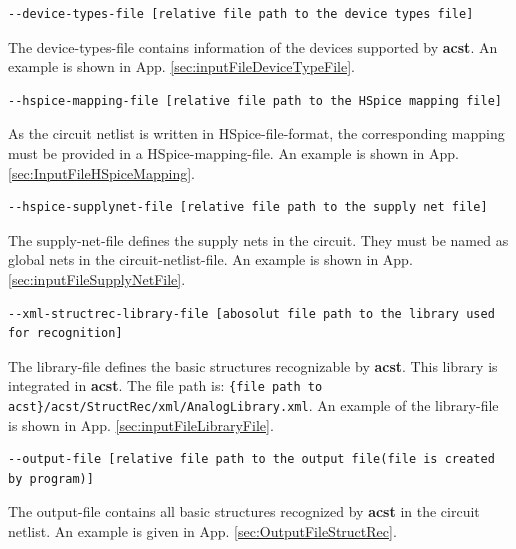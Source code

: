 \begin{lstlisting}[basicstyle=\ttfamily\scriptsize,backgroundcolor={\color{gray!30}}, escapechar=? ]
--device-types-file [relative file path to the device types file]
\end{lstlisting}
The device-types-file contains information of the devices supported by {\bf acst}. An example is shown in App. \ref{sec:inputFileDeviceTypeFile}.
\\

\begin{lstlisting}[basicstyle=\ttfamily\scriptsize,backgroundcolor={\color{gray!30}}, escapechar=? ]
--hspice-mapping-file [relative file path to the HSpice mapping file]
\end{lstlisting}
As the circuit netlist is written in HSpice-file-format, the corresponding mapping must be provided in a HSpice-mapping-file. An example is shown in App. \ref{sec:InputFileHSpiceMapping}.
\\

\begin{lstlisting}[basicstyle=\ttfamily\scriptsize,backgroundcolor={\color{gray!30}}, escapechar=? ]
--hspice-supplynet-file [relative file path to the supply net file]
\end{lstlisting}
The supply-net-file defines the supply nets in the circuit. They must be named as global nets in the circuit-netlist-file. An example is shown in App. \ref{sec:inputFileSupplyNetFile}.
\\

\begin{lstlisting}[basicstyle=\ttfamily\scriptsize,backgroundcolor={\color{gray!30}}, escapechar=? ]
--xml-structrec-library-file [abosolut file path to the library used for recognition] 
\end{lstlisting}
The library-file defines the basic structures recognizable by {\bf acst}. This library is integrated in {\bf acst}. The file path is: {\tt \{file path to acst\}/acst/StructRec/xml/AnalogLibrary.xml}. An example of the library-file is shown in App. \ref{sec:inputFileLibraryFile}.
\\

\begin{lstlisting}[basicstyle=\ttfamily\scriptsize,backgroundcolor={\color{gray!30}}, escapechar=? ]
--output-file [relative file path to the output file(file is created by program)] 
\end{lstlisting}
The output-file contains all basic structures recognized by {\bf acst} in the circuit netlist. An example is given in App. \ref{sec:OutputFileStructRec}.

